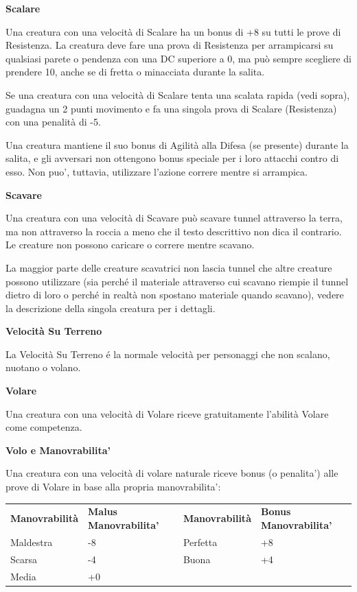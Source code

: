 \documentclass[a4paper,11pt,twoside,openany]{book}
\begin{document}
\textbf{Scalare}

Una creatura con una velocità di Scalare ha un bonus di +8 su tutti le prove di Resistenza. La creatura deve fare una prova di Resistenza per arrampicarsi su qualsiasi parete o pendenza con una DC superiore a 0, ma può sempre scegliere di prendere 10, anche se di fretta o minacciata durante la salita.

Se una creatura con una velocità di Scalare tenta una scalata rapida (vedi sopra), guadagna un 2 punti movimento e fa una singola prova di Scalare (Resistenza) con una penalità di -5.

Una creatura mantiene il suo bonus di Agilità alla Difesa (se presente) durante la salita, e gli avversari non ottengono bonus speciale per i loro attacchi contro di esso. Non puo', tuttavia, utilizzare l'azione correre mentre si arrampica.

\textbf{Scavare}

Una creatura con una velocità di Scavare può scavare tunnel attraverso la terra, ma non attraverso la roccia a meno che il testo descrittivo non dica il contrario. Le creature non possono caricare o correre mentre scavano.

La maggior parte delle creature scavatrici non lascia tunnel che altre creature possono utilizzare (sia perché il materiale attraverso cui scavano riempie il tunnel dietro di loro o perché in realtà non spostano materiale quando scavano), vedere la descrizione della singola creatura per i dettagli.

\textbf{Velocità Su Terreno}

La Velocità Su Terreno é la normale velocità per personaggi che non scalano, nuotano o volano.

\textbf{Volare}

Una creatura con una velocità di Volare riceve gratuitamente l'abilità Volare come competenza.

\textbf{Volo e Manovrabilita'}

\medskip

Una creatura con una velocità di volare naturale riceve bonus (o penalita') alle prove di Volare in base alla propria manovrabilita':

\begin{tabular}{llll}
	\hline
	\textbf{Manovrabilità} & \textbf{ Malus Manovrabilita'} & \textbf{Manovrabilità} & \textbf{ Bonus Manovrabilita'} \\
	Maldestra              & -8             & Perfetta               & +8             \\
	Scarsa & -4             & Buona  & +4             \\
	Media  & +0       \\
\end{tabular}
\end{document}
